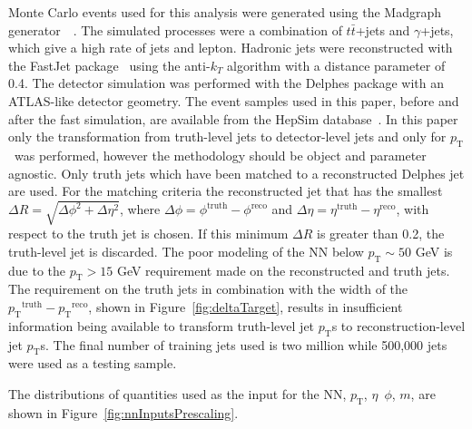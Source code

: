 \documentclass[showpacs,showkeys,preprint,prd,nofootinbib,linenumbers,12pt]{revtex4-1}
\def\pt{\ensuremath{p_{\mathrm{T}}}}
\def\ptRes{\ensuremath{\pt^{\mathrm{truth}}-\pt^{\mathrm{reco}}}}
\begin{document}
Monte Carlo events used for this analysis were generated using the Madgraph generator~~\cite{Alwall:2014hca}. The simulated processes were a combination of $t\bar{t}$+jets and $\gamma$+jets, which give a high rate of jets and lepton. 
Hadronic jets were reconstructed with the {\sc FastJet} package~\cite{Fastjet} using the anti-$k_T$ algorithm \cite{Cacciari:2008gp} with a distance parameter of 0.4. The detector simulation was performed with the Delphes package \cite{deFavereau:2013fsa} with an ATLAS-like detector geometry. 
The event samples used in this paper, before and after the fast simulation, are available from the HepSim database~\cite{Chekanov:2014fga}. In this paper only the transformation from truth-level jets to detector-level jets and only for \pt\ was performed, however the methodology should be object and parameter agnostic. Only truth jets which have been matched to a reconstructed Delphes jet are used. For the matching criteria the reconstructed jet that has the smallest $\Delta R=\sqrt{\Delta\phi^2+\Delta\eta^2}$, where $\Delta\phi=\phi^{\text{truth}}-\phi^{\text{reco}}$ and $\Delta\eta=\eta^{\text{truth}}-\eta^{\text{reco}}$, with respect to the truth jet is chosen. If this minimum $\Delta R$ is greater than 0.2, the truth-level jet is discarded.
The poor modeling of the NN below $\pt\sim 50$ GeV is due to the $\pt>15$ GeV requirement made on the reconstructed and truth jets. The requirement on the truth jets in combination with the width of the \ptRes, shown in Figure~\ref{fig:deltaTarget}, results in insufficient information being available to transform truth-level jet \pt s to reconstruction-level jet \pt s.
The final number of training jets used is two million while 500,000 jets were used as a testing sample.  

The distributions of quantities used as the input for the NN, \pt, $\eta$\, $\phi$, $m$, are shown in Figure~\ref{fig:nnInputsPrescaling}.
\end{document}
